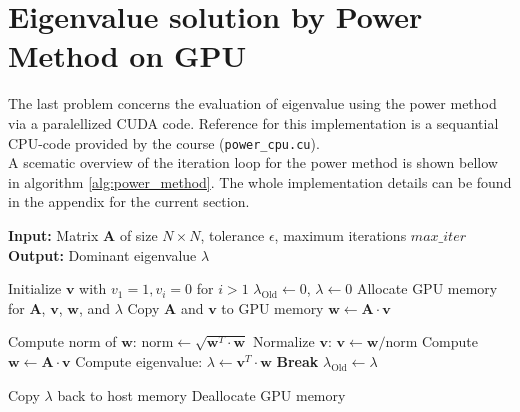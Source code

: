 \section{Eigenvalue solution by Power Method on GPU}
\label{sec:ev}
The last problem concerns the evaluation of eigenvalue using the power method via a paralellized CUDA code. Reference for this implementation is a sequantial CPU-code provided by the course (\texttt{power\_cpu.cu}).\\

A scematic overview of the iteration loop for the power method is shown bellow in algorithm \autoref{alg:power_method}. The whole implementation details can be found in the appendix for the current section.\\
\begin{algorithm}
    \caption{}
    \label{alg:power_method}
    \begin{algorithmic}[1]
    \State \textbf{Input:} Matrix $\mathbf{A}$ of size $N \times N$, tolerance $\epsilon$, maximum iterations $max\_iter$
    \State \textbf{Output:} Dominant eigenvalue $\lambda$
    
    \State Initialize $\mathbf{v}$ with $v_1 = 1, v_i = 0$ for $i > 1$
    \State $\lambda_\text{Old} \gets 0$, $\lambda \gets 0$
    \State Allocate GPU memory for $\mathbf{A}$, $\mathbf{v}$, $\mathbf{w}$, and $\lambda$
    \State Copy $\mathbf{A}$ and $\mathbf{v}$ to GPU memory
    \State $\mathbf{w} \gets \mathbf{A} \cdot \mathbf{v}$ 
    
        \State Compute norm of $\mathbf{w}$: $\text{norm} \gets \sqrt{\mathbf{w}^T \cdot \mathbf{w}}$ 
        \State Normalize $\mathbf{v}$: $\mathbf{v} \gets \mathbf{w} / \text{norm}$ 
        \State Compute $\mathbf{w} \gets \mathbf{A} \cdot \mathbf{v}$ 
        \State Compute eigenvalue: $\lambda \gets \mathbf{v}^T \cdot \mathbf{w}$ 
            \State \textbf{Break} 
        \EndIf
        \State $\lambda_\text{Old} \gets \lambda$
    \EndFor
    
    \State Copy $\lambda$ back to host memory
    \State Deallocate GPU memory
    \end{algorithmic}
\end{algorithm}

